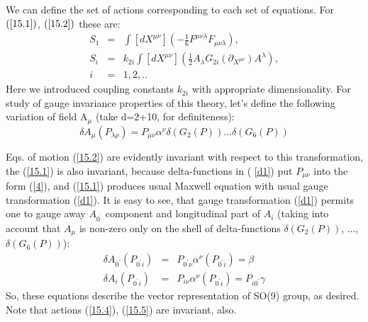 \documentclass[a4paper,12pt]{article}
\begin{document}
We can define the set of actions corresponding to each set of
equations. For  $(\ref{15.1})$, $(\ref{15.2})$ these are:
\begin{eqnarray}
S_{1} &=&\int [dX^{\mu \nu }]\left( -\frac{1}{6}F^{\mu \nu \lambda
}F_{\mu
\nu \lambda }\right) ,  \label{15.4} \\
S_{i} &=&k_{2i}\int [dX^{\mu \nu }]\left( \frac{1}{2}A_{\lambda
}G_{2i}(\partial _{X^{\mu \nu }})A^{\lambda }\right) ,  \label{15.5} \\
i &=&1,2,..  \nonumber
\end{eqnarray}
Here we introduced coupling constants $k_{2i}$ with appropriate
dimensionality. For study of gauge invariance properties of this
theory, let's define the following variation of field A$ _{\mu }$
(take d=2+10, for definiteness):
\begin{equation}
\delta A_{\mu }(P_{\lambda \rho })=P_{\mu \nu }\alpha ^{\nu
}\delta (G_{2}(P))...\delta (G_{6}(P))  \label{d1}
\end{equation}

Eqs. of motion (\ref{15.2}) are evidently invariant with respect
to this transformation, the (\ref{15.1}) is also invariant,
because delta-functions in ( \ref{d1}) put $P_{\mu \nu }$ into the
form (\ref{4}), and (\ref{15.1}) produces usual Maxwell equation
with usual gauge transformation (\ref{d1}). It is easy to see,
that gauge transformation (\ref{d1}) permits one to gauge away $
A_{0^{^{\prime }}}$ component and longitudinal part of $A_{i}$
(taking into account that $A_{\mu }$ is non-zero only on the shell
of delta-functions $ \delta (G_{2}(P))$, ...,$\delta (G_{6}(P))$):
\begin{eqnarray}
\delta A_{0^{\prime }}(P_{0^{\prime }i}) &=&P_{0^{\prime }\nu
}\alpha ^{\nu
}(P_{0^{\prime }i})=\beta  \label{d2} \\
\delta A_{i}(P_{0^{\prime }i}) &=&P_{i\nu }\alpha ^{\nu
}(P_{0^{\prime }i})=P_{i0^{\prime }}\gamma  \label{d3}
\end{eqnarray}
So, these equations describe the vector representation of SO(9)
group, as desired. Note that actions (\ref{15.4}), (\ref{15.5})
are invariant, also.
\end{document}
